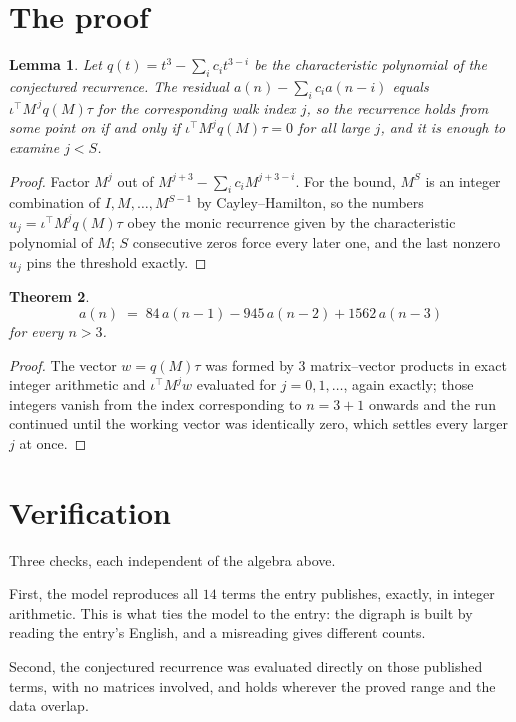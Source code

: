 \documentclass[11pt,a4paper]{article}
\theoremstyle{plain}
\newtheorem{theorem}{Theorem}
\newtheorem{lemma}[theorem]{Lemma}
\theoremstyle{definition}
\begin{document}
\section{The proof}

\begin{lemma}\label{lem:crit}
Let $q(t)=t^{3}-\sum_i c_it^{3-i}$ be the characteristic polynomial of the
conjectured recurrence. The residual $a(n)-\sum_ic_ia(n-i)$ equals
$\iota^{\!\top}M^{\,j}q(M)\tau$ for the corresponding walk index $j$, so the recurrence
holds from some point on if and only if $\iota^{\!\top}M^{j}q(M)\tau=0$ for all large $j$,
and it is enough to examine $j<S$.
\end{lemma}

\begin{proof}
Factor $M^{j}$ out of $M^{j+3}-\sum_ic_iM^{j+3-i}$. For the bound, $M^{S}$
is an integer combination of $I,M,\dots,M^{S-1}$ by Cayley--Hamilton, so the numbers
$u_j=\iota^{\!\top}M^{j}q(M)\tau$ obey the monic recurrence given by the characteristic
polynomial of $M$; $S$ consecutive zeros force every later one, and the last nonzero $u_j$
pins the threshold exactly.
\end{proof}

\begin{theorem}
\[
a(n)\;=\;84\,a(n-1) - 945\,a(n-2) + 1562\,a(n-3)
\]
for every $n>3$.
\end{theorem}

\begin{proof}
The vector $w=q(M)\tau$ was formed by $3$ matrix--vector products in exact integer
arithmetic and $\iota^{\!\top}M^{j}w$ evaluated for $j=0,1,\dots$, again exactly; those
integers vanish from the index corresponding to $n=3+1$ onwards and the run continued
until the working vector was identically zero, which settles every larger $j$ at once.
\end{proof}

\section{Verification}

Three checks, each independent of the algebra above.

First, the model reproduces all $14$ terms the entry publishes, exactly, in integer
arithmetic. This is what ties the model to the entry: the digraph is built by reading the
entry's English, and a misreading gives different counts.

Second, the conjectured recurrence was evaluated directly on those published terms, with no
matrices involved, and holds wherever the proved range and the data overlap.
\end{document}
